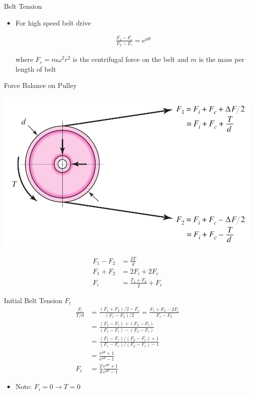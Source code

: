\documentclass[10pt, svgnames]{beamer}
\begin{document}
\begin{frame}[label={sec:orga8718d1}]{Belt Tension}
\begin{itemize}
\item For high speed belt drive

\begin{align*}
    \frac{F_1 - F_c}{F_2 - F_c} = e^{\mu \theta}
\end{align*}

where \(F_c = m \omega^2 r^2\) is the centrifugal force on the belt
and \(m\) is the \alert{mass per length} of belt
\end{itemize}
\end{frame}

\begin{frame}[label={sec:org9575184}]{Force Balance on Pulley}
\begin{center}
\includegraphics[height=0.5\textheight]{./pictures/forces-on-pulley.png}
\end{center}

\begin{align*}
  F_{1} - F_{2} &= \frac{2T}{d} \\
  F_{1} + F_{2} &= 2F_{i} + 2F_{c} \\
  F_{i} &= \frac{F_{1} + F_{2}}{2} + F_{c}
\end{align*}
\end{frame}

\begin{frame}[label={sec:org647f61a}]{Initial Belt Tension \(F_{i}\)}
\begin{align*}
  \frac{F_{i}}{T/d} &= \frac{(F_{1} + F_{2})/2 - F_{c}}{(F_{1} - F_{2})/2} = \frac{F_{1} + F_{2} - 2F_{c}}{F_{1} - F_{2}} \\
                    &= \frac{(F_{1} - F_{c}) + (F_{2} - F_{c})}{(F_{1} - F_{c}) - (F_{2} - F_{c})} \\
                    &= \frac{(F_{1} - F_{c})/(F_{2} - F_{c}) + 1}{(F_{1} - F_{c})/(F_{2} - F_{c}) - 1} \\
                    &= \frac{e^{\mu\theta} + 1}{e^{\mu\theta} - 1} \\
  F_{i} &= \frac{T}{d}\frac{e^{\mu \theta} + 1}{e^{\mu \theta} - 1}
\end{align*}

\begin{itemize}
\item Note: \(F_{i} = 0 \rightarrow T = 0\)
\end{itemize}
\end{frame}
\end{document}
